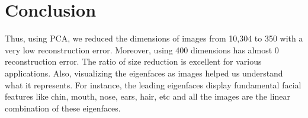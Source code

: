 \documentclass[letterpaper,12pt]{article}
\begin{document}
\section{Conclusion}\label{conclusion}
Thus, using PCA, we reduced the dimensions of images from 10,304 to 350 with a very low reconstruction error. Moreover, using 400 dimensions has almost 0 reconstruction error. The ratio of size reduction is excellent for various applications. Also, visualizing the eigenfaces as images helped us understand what it represents. For instance, the leading eigenfaces display fundamental facial features like chin,  mouth, nose, ears, hair, etc and all the images are the linear combination of these eigenfaces.
\end{document}
